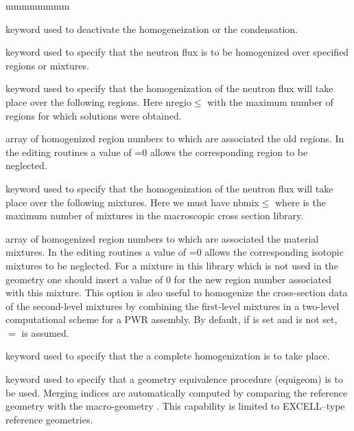 \begin{ListeDeDescription}{mmmmmmmm}
\item[\moc{NONE}] keyword used to deactivate the homogeneization or the condensation. 

\item[\moc{MERG}] keyword used to specify that the neutron flux is to be
homogenized over specified regions or mixtures. 

\item[\moc{REGI}] keyword used to specify that the homogenization of the neutron
flux will take place over the following regions. Here nregio$\le$
with  the maximum number of regions for which solutions were
obtained.

\item[\dusa{iregm}] array of homogenized region numbers to which are
associated the old regions. In the editing routines a value of =0
allows the corresponding region to be neglected. 

\item[\moc{MIX}] keyword used to specify that the homogenization of the neutron
flux will take place over the following mixtures. Here
we must have nbmix$\le$ where  is the maximum number
of mixtures in the macroscopic cross section library.  

\item[\dusa{imixm}] array of homogenized region numbers to which are
associated the material mixtures. In the editing routines a value of
=0 allows the corresponding isotopic mixtures to be neglected. For a mixture in this
library which is not used in the geometry one should insert a value of 0 for the
new region number associated with this mixture. This option is also useful to homogenize the cross-section data of the second-level mixtures by combining the first-level mixtures in
a two-level computational scheme for a PWR assembly. By default, if  is set and
 is not set, $=$ is assumed.

\item[\moc{COMP}] keyword used to specify that the a complete homogenization is to
take place. 

\item[\moc{GEO}] keyword used to specify that a geometry equivalence procedure (equigeom) is to be used. Merging indices
are automatically computed by comparing the reference geometry  with the macro-geometry .
This capability is limited to EXCELL--type reference geometries.


\end{ListeDeDescription}
